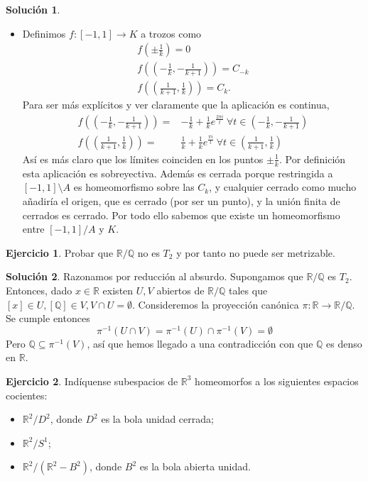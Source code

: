 \documentclass{article}
\theoremstyle{plain}
\theoremstyle{definition}
\newtheorem{exercise}{Ejercicio}
\newtheorem*{sol*}{Solución}
\newcommand{\R}{\mathbb{R}}
\newcommand{\Q}{\mathbb{Q}}
\begin{document}
\begin{sol*}
\begin{itemize}
\item Definimos $f:[-1,1]\rightarrow K$ a trozos como 
\begin{gather*}
f\left(\pm\frac{1}{k}\right)=0\\
f\left(\left(-\frac{1}{k},-\frac{1}{k+1}\right)\right)=C_{-k}\\
f\left(\left(\frac{1}{k+1},\frac{1}{k}\right)\right)=C_k.
\end{gather*}
Para ser más explícitos y ver claramente que la aplicación es continua, 
\begin{align*}
f\left(\left(-\frac{1}{k},-\frac{1}{k+1}\right)\right)=&-\frac{1}{k}+\frac{1}{k}e^{\frac{2\pi i}{t}}\ \forall t\in\left(-\frac{1}{k},-\frac{1}{k+1}\right)\\
f\left(\left(\frac{1}{k+1},\frac{1}{k}\right)\right)=&\frac{1}{k}+\frac{1}{k}e^{\frac{\pi i}{t}}\ \forall t\in\left(\frac{1}{k+1},\frac{1}{k}\right)
\end{align*}
Así es más claro que los límites coinciden en los puntos $\pm\frac{1}{k}$. Por definición esta aplicación es sobreyectiva. Además es cerrada porque restringida a $[-1,1]\setminus A$ es homeomorfismo sobre las $C_k$, y cualquier cerrado como mucho añadiría el origen, que es cerrado (por ser un punto), y la unión finita de cerrados es cerrado.
Por todo ello sabemos que existe un homeomorfismo entre $[-1,1]/A$ y $K$. 
\end{itemize} 

\end{sol*}

\newpage
\begin{exercise}
Probar que $\mathbb{R}/\mathbb{Q}$ no es $T_2$ y por tanto no puede ser metrizable.
\end{exercise}
\begin{sol*}
Razonamos por reducción al absurdo. Supongamos que $\mathbb{R}/\mathbb{Q}$ es $T_2$. Entonces, dado $x\in\R$ existen $U,V$ abiertos de $\mathbb{R}/\mathbb{Q}$ tales que $[x]\in U, [\Q]\in V, V\cap U=\emptyset$. Consideremos la proyección canónica $\pi:\R\rightarrow\mathbb{R}/\mathbb{Q}$. Se cumple entonces
\[\pi^{-1}(U\cap V)=\pi^{-1}(U)\cap\pi^{-1}(V)=\emptyset\]
Pero $\Q\subseteq \pi^{-1}(V)$, así que hemos llegado a una contradicción con que $\Q$ es denso en $\R$. 
\end{sol*}


\newpage
\begin{exercise}
Indíquense subespacios de $\mathbb{R}^3$ homeomorfos a los siguientes espacios cocientes:
\begin{itemize}
	\item $\mathbb{R}^2/D^2$, donde $D^2$ es la bola unidad cerrada;
	\item $\mathbb{R}^2/S^1$;
	\item $\mathbb{R}^2/(\mathbb{R}^2-B^2)$, donde $B^2$ es la bola abierta unidad.
\end{itemize}
\end{exercise}
\end{document}
